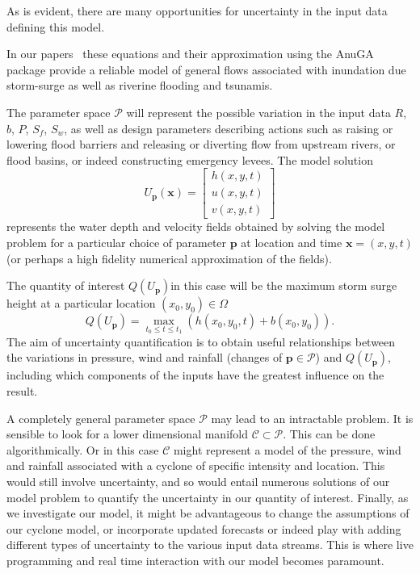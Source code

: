 As is evident, there are many opportunities for uncertainty in the input  data defining this model. 

In our papers~\parencite{anugamanual,nielsen2005hydrodynamic}  these
equations and their approximation using the  AnuGA package provide a reliable
model of general flows associated with inundation due storm-surge as well as riverine flooding and tsunamis.

The parameter space $\mathcal{P}$ will represent the possible variation in the input data $R$, $b$, $P$, $S_f$, $S_w$, as well as design parameters describing actions such as raising or lowering flood barriers and releasing or diverting flow from upstream rivers, or flood basins, or indeed constructing emergency levees. 
The model solution 
$$
U_{\mathbf{p}} (\mathbf{x})  = \begin{bmatrix} h(x,y,t) \\ u(x,y,t) \\ v(x,y,t) \end{bmatrix}
$$
represents the water depth and velocity fields obtained by solving the model problem for a particular choice of parameter $\mathbf{p}$ at location and time $\mathbf{x} = (x,y,t)$ (or perhaps a high fidelity numerical approximation of the fields). 

The quantity of interest $Q(U_{\mathbf{p}})$in this case will be the maximum storm surge height at a particular location $(x_0, y_0) \in \Omega$
$$ 
Q(U_{\mathbf{p}})  = \max_{t_0 \leq t \leq t_1} \left( h(x_0,y_0,t) + b(x_0,y_0) \right).
$$
The aim of  uncertainty quantification is to obtain useful relationships between the variations in pressure, wind and rainfall (changes of $\mathbf{p} \in \mathcal{P}$) and $Q(U_{\mathbf{p}})$, including which components of the inputs  have the greatest influence on the result. 

A completely general parameter space $\mathcal{P}$ may lead to an intractable problem. It is sensible to look for a lower dimensional manifold $\mathcal{C} \subset \mathcal{P}$. This can be done algorithmically. Or in this case $\mathcal{C}$ might represent a model of the pressure, wind and rainfall associated with a cyclone of specific intensity and location. This would still involve uncertainty, and so would entail numerous solutions of our model problem to quantify the uncertainty in our quantity of interest. Finally, as we investigate our model, it might be advantageous to change the assumptions of our cyclone model, or incorporate updated forecasts or indeed play with adding different types of uncertainty to the various input data streams. This is where live programming and real time interaction with our model becomes paramount. 